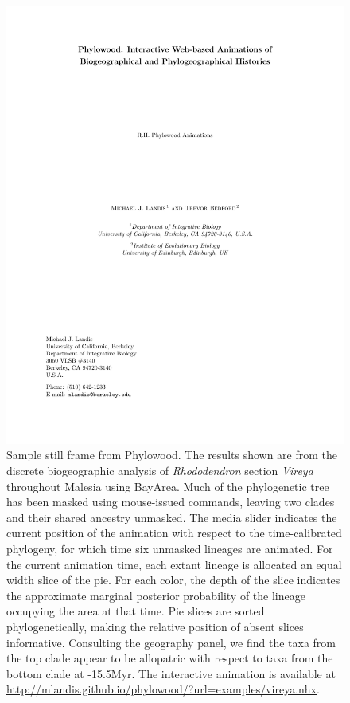 \documentclass[11pt]{article}
\begin{document}
\begin{figure}
\begin{center}
\includegraphics[width=\textwidth]{phylowood}
\caption{
Sample still frame from Phylowood. The results shown are from the discrete biogeographic analysis of {\it Rhododendron} section {\it Vireya} throughout Malesia using BayArea. Much of the phylogenetic tree has been masked using mouse-issued commands, leaving two clades and their shared ancestry unmasked. The media slider indicates the current position of the animation with respect to the time-calibrated phylogeny, for which time six unmasked lineages are animated.  For the current animation time, each extant lineage is allocated an equal width slice of the pie. For each color, the depth of the slice indicates the approximate marginal posterior probability of the lineage occupying the area at that time. Pie slices are sorted phylogenetically, making the relative position of absent slices informative. Consulting the geography panel, we find the taxa from the top clade appear to be allopatric with respect to taxa from the bottom clade at -15.5Myr. The interactive animation is available at \url{http://mlandis.github.io/phylowood/?url=examples/vireya.nhx}.
}
\label{phylowood}
\end{center}
\end{figure}
\end{document}
